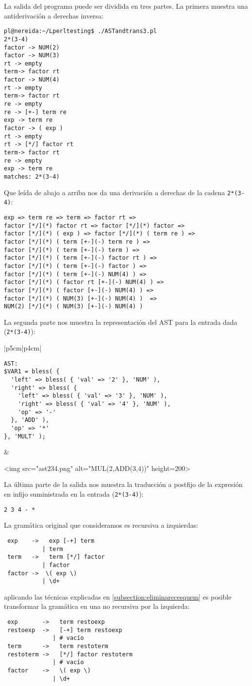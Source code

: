 La salida del programa puede ser dividida en tres partes.
La primera muestra una antiderivación a derechas inversa:
\begin{verbatim}
pl@nereida:~/Lperltesting$ ./ASTandtrans3.pl
2*(3-4)
factor -> NUM(2)
factor -> NUM(3)
rt -> empty
term-> factor rt
factor -> NUM(4)
rt -> empty
term-> factor rt
re -> empty
re -> [+-] term re
exp -> term re
factor -> ( exp )
rt -> empty
rt -> [*/] factor rt
term-> factor rt
re -> empty
exp -> term re
matches: 2*(3-4)
\end{verbatim}
Que leída de abajo a arriba nos da una derivación a derechas de la cadena \verb|2*(3-4)|:
\begin{verbatim}
exp => term re => term => factor rt => 
factor [*/](*) factor rt => factor [*/](*) factor => 
factor [*/](*) ( exp ) => factor [*/](*) ( term re ) =>  
factor [*/](*) ( term [+-](-) term re ) =>  
factor [*/](*) ( term [+-](-) term ) => 
factor [*/](*) ( term [+-](-) factor rt ) =>
factor [*/](*) ( term [+-](-) factor ) => 
factor [*/](*) ( term [+-](-) NUM(4) ) =>
factor [*/](*) ( factor rt [+-](-) NUM(4) ) => 
factor [*/](*) ( factor [+-](-) NUM(4) ) =>
factor [*/](*) ( NUM(3) [+-](-) NUM(4) )  => 
NUM(2) [*/](*) ( NUM(3) [+-](-) NUM(4) )
\end{verbatim}
La segunda parte nos muestra la representación del AST para la entrada dada (\verb|2*(3-4)|):
\begin{tabular}{|p{5cm}|p{4cm}|}
\begin{verbatim}
AST:
$VAR1 = bless( {
  'left' => bless( { 'val' => '2' }, 'NUM' ),
  'right' => bless( {
    'left' => bless( { 'val' => '3' }, 'NUM' ),
    'right' => bless( { 'val' => '4' }, 'NUM' ),
    'op' => '-'
  }, 'ADD' ),
  'op' => '*'
}, 'MULT' );
\end{verbatim}
&
\begin{rawhtml}
<img src="ast234.png" alt="MUL(2,ADD(3,4))" height=200>
\end{rawhtml}
\end{tabular}

La última parte de la salida nos muestra la traducción a postfijo
de la expresión en infijo
suministrada en la entrada (\verb|2*(3-4)|):
\begin{verbatim}
2 3 4 - *
\end{verbatim}


La gramática original que consideramos
es recursiva a izquierdas:
\begin{verbatim}
 exp    ->   exp [-+] term
           | term
 term   ->   term [*/] factor
           | factor
 factor ->  \( exp \)
           | \d+
\end{verbatim}
aplicando las técnicas explicadas en
\ref{subsection:eliminarecesquem}
es posible transformar la gramática 
en una no recursiva por la izquierda:
\begin{verbatim}
 exp       ->   term restoexp
 restoexp  ->   [-+] term restoexp
              | # vacío
 term      ->   term restoterm
 restoterm ->   [*/] factor restoterm
              | # vacío
 factor    ->   \( exp \)
              | \d+
\end{verbatim}

